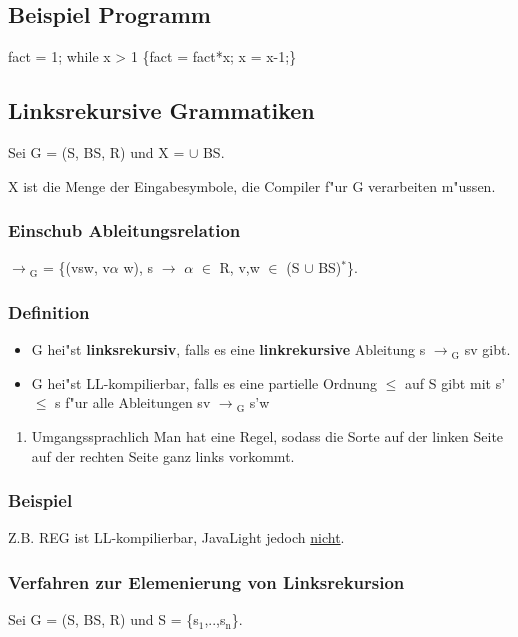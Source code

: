 \documentclass[11pt]{article}
\begin{document}
\subsection{Beispiel Programm}
\label{sec-4-3}

fact = 1; while x > 1 \{fact = fact*x; x = x-1;\}

\subsection{Linksrekursive Grammatiken}
\label{sec-4-4}

Sei G = (S, BS, R) und X = $\cup$ BS. 

X ist die Menge der Eingabesymbole, die Compiler f"ur G verarbeiten m"ussen.

\subsubsection{Einschub Ableitungsrelation}
\label{sec-4-4-1}
$\to$$_{\text{G}}$ = \{(vsw, v$\alpha$ w), s $\to$ $\alpha$ $\in$ R, v,w $\in$ (S $\cup$ BS)$^{\text{*}}$\}.


\subsubsection{Definition}
\label{sec-4-4-2}
\begin{itemize}
\item G hei"st \textbf{linksrekursiv}, falls es eine \textbf{linkrekursive} Ableitung s $\to$$_{\text{G}}$ sv gibt.
\item G hei"st LL-kompilierbar, falls es eine partielle Ordnung $\le$ auf S gibt mit s' $\le$ s f"ur alle Ableitungen sv $\to$$_{\text{G}}$ s'w
\end{itemize}
\begin{enumerate}
\item Umgangssprachlich
\label{sec-4-4-2-1}
Man hat eine Regel, sodass die Sorte auf der linken Seite auf der rechten Seite ganz links vorkommt.
\end{enumerate}

\subsubsection{Beispiel}
\label{sec-4-4-3}
Z.B. REG ist LL-kompilierbar, JavaLight jedoch \uline{nicht}. 

\subsubsection{Verfahren zur Elemenierung von Linksrekursion}
\label{sec-4-4-4}
Sei G = (S, BS, R) und S = \{s$_{\text{1}}$,..,s$_{\text{n}}$\}.
\end{document}
